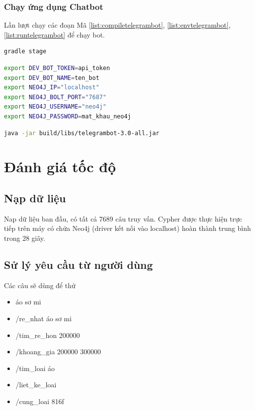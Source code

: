 \subsubsection{Chạy ứng dụng Chatbot}

Lần lượt chạy các đoạn Mã \ref{list:compiletelegrambot}, \ref{list:envtelegrambot}, \ref{list:runtelegrambot} để chạy bot. 

\begin{lstlisting}[language=bash,caption={Biên dịch mã nguồn},label={list:compiletelegrambot}]
gradle stage 
\end{lstlisting}

\begin{lstlisting}[language=bash,caption={Tạo các biến môi trường},label={list:envtelegrambot}]
export DEV_BOT_TOKEN=api_token
export DEV_BOT_NAME=ten_bot
export NEO4J_IP="localhost" 
export NEO4J_BOLT_PORT="7687"
export NEO4J_USERNAME="neo4j"
export NEO4J_PASSWORD=mat_khau_neo4j
\end{lstlisting}

\begin{lstlisting}[language=bash,caption={Chạy bot},label={list:runtelegrambot}]
java -jar build/libs/telegrambot-3.0-all.jar
\end{lstlisting}

\section{Đánh giá tốc độ} 

\subsection{Nạp dữ liệu}

Nap dữ liệu ban đầu, có tất cả 7689 câu truy vấn. Cypher được thực hiện trực tiếp trên máy có chứa Neo4j (driver kết nối vào localhost) hoàn thành trung bình trong 28 giây. 


\subsection{Sử lý yêu cầu từ người dùng}

Các câu sẽ dùng để thử 

\begin{itemize}
\item áo sơ mi
\item /re\_nhat áo sơ mi
\item /tim\_re\_hon 200000
\item /khoang\_gia 200000 300000
\item /tim\_loai áo
\item /liet\_ke\_loai
\item /cung\_loai 816f
\end{itemize}

